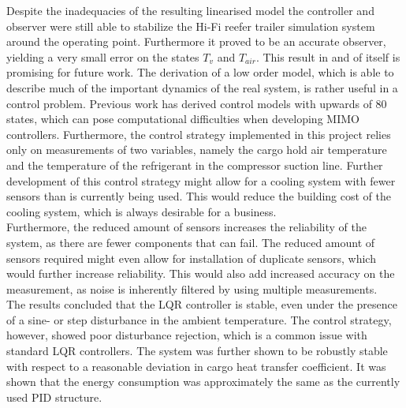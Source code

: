 Despite the inadequacies of the resulting linearised model the controller and observer were still able to stabilize the Hi-Fi reefer trailer simulation system around the operating point. Furthermore it proved to be an accurate observer, yielding a very small error on the states $T_v$ and $T_{air}$. This result in and of itself is promising for future work. The derivation of a low order model, which is able to describe much of the important dynamics of the real system, is rather useful in a control problem. Previous work has derived control models with upwards of 80 states, which can pose computational difficulties when developing MIMO controllers. Furthermore, the control strategy implemented in this project relies only on measurements of two variables, namely the cargo hold air temperature and the temperature of the refrigerant in the compressor suction line. Further development of this control strategy might allow for a cooling system with fewer sensors than is currently being used. This would reduce the building cost of the cooling system, which is always desirable for a business. \\

Furthermore, the reduced amount of sensors increases the reliability of the system, as there are fewer components that can fail. The reduced amount of sensors required might even allow for installation of duplicate sensors, which would further increase reliability. This would also add increased accuracy on the measurement, as noise is inherently filtered by using multiple measurements.\\

The results concluded that the LQR controller is stable, even under the presence of a sine- or step disturbance in the ambient temperature. The control strategy, however, showed poor disturbance rejection, which is a common issue with standard LQR controllers. The system was further shown to be robustly stable with respect to a reasonable deviation in cargo heat transfer coefficient. It was shown that the energy consumption was approximately the same as the currently used PID structure.\\


















